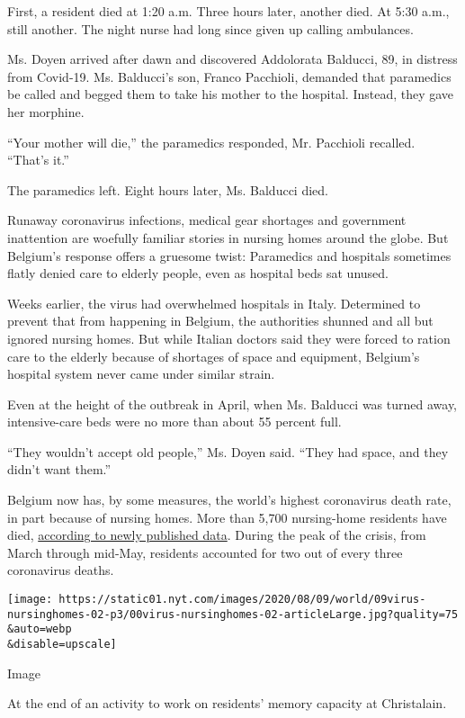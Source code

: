 First, a resident died at 1:20 a.m. Three hours later, another died. At
5:30 a.m., still another. The night nurse had long since given up
calling ambulances.

Ms. Doyen arrived after dawn and discovered Addolorata Balducci, 89, in
distress from Covid-19. Ms. Balducci's son, Franco Pacchioli, demanded
that paramedics be called and begged them to take his mother to the
hospital. Instead, they gave her morphine.

``Your mother will die,'' the paramedics responded, Mr. Pacchioli
recalled. ``That's it.''

The paramedics left. Eight hours later, Ms. Balducci died.

Runaway coronavirus infections, medical gear shortages and government
inattention are woefully familiar stories in nursing homes around the
globe. But Belgium's response offers a gruesome twist: Paramedics and
hospitals sometimes flatly denied care to elderly people, even as
hospital beds sat unused.

Weeks earlier, the virus had overwhelmed hospitals in Italy. Determined
to prevent that from happening in Belgium, the authorities shunned and
all but ignored nursing homes. But while Italian doctors said they were
forced to ration care to the elderly because of shortages of space and
equipment, Belgium's hospital system never came under similar strain.

Even at the height of the outbreak in April, when Ms. Balducci was
turned away, intensive-care beds were no more than about 55 percent
full.

``They wouldn't accept old people,'' Ms. Doyen said. ``They had space,
and they didn't want them.''

Belgium now has, by some measures, the world's highest coronavirus death
rate, in part because of nursing homes. More than 5,700 nursing-home
residents have died,
\href{https://www.medrxiv.org/content/10.1101/2020.06.20.20136234v1.full.pdf}{according
to newly published data}. During the peak of the crisis, from March
through mid-May, residents accounted for two out of every three
coronavirus deaths.

\texttt{[image: https://static01.nyt.com/images/2020/08/09/world/09virus-nursinghomes-02-p3/00virus-nursinghomes-02-articleLarge.jpg?quality=75\\\&auto=webp\\\&disable=upscale]}

Image

At the end of an activity to work on residents' memory capacity at
Christalain.

